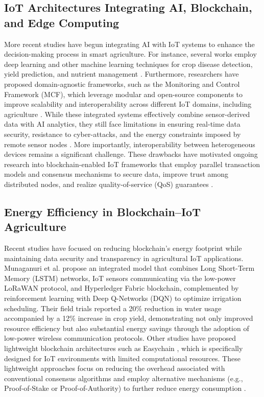 \documentclass[12pt,onecolumn]{IEEEtran} %
\begin{document}
  \subsection{IoT Architectures Integrating AI, Blockchain, and Edge Computing}\label{subsec:lit-ai-bc-edge}
More recent studies have begun integrating AI with IoT systems to enhance the decision-making process in smart agriculture. For instance, several works employ deep learning and other machine learning techniques for crop disease detection, yield prediction, and nutrient management \cite{raju2022aselfpoweredrealtime, bakthavatchalam2022iotframeworkfor}. Furthermore, researchers have proposed domain-agnostic frameworks, such as the Monitoring and Control Framework (MCF), which leverage modular and open-source components to improve scalability and interoperability across different IoT domains, including agriculture \cite{senoo2023monitoringandcontrol, senoo2023monitoringandcontrol}. While these integrated systems effectively combine sensor-derived data with AI analytics, they still face limitations in ensuring real-time data security, resistance to cyber-attacks, and the energy constraints imposed by remote sensor nodes \cite{abunadi2022trafficawaresecuredcooperative, ouafiq2022datamanagementand}. More importantly, interoperability between heterogeneous devices remains a significant challenge. These drawbacks have motivated ongoing research into blockchain-enabled IoT frameworks that employ parallel transaction models and consensus mechanisms to secure data, improve trust among distributed nodes, and realize quality-of-service (QoS) guarantees \cite{quy2022iotenabledsmartagriculture, abunadi2022trafficawaresecuredcooperative}.


  \subsection{Energy Efficiency in Blockchain–IoT Agriculture}\label{subsec:lit-energy}
Recent studies have focused on reducing blockchain’s energy footprint while maintaining data security and transparency in agricultural IoT applications. Munaganuri et al. \cite{munaganuri2025designofan} propose an integrated model that combines Long Short-Term Memory (LSTM) networks, IoT sensors communicating via the low-power LoRaWAN protocol, and Hyperledger Fabric blockchain, complemented by reinforcement learning with Deep Q-Networks (DQN) to optimize irrigation scheduling. Their field trials reported a 20\% reduction in water usage accompanied by a 12\% increase in crop yield, demonstrating not only improved resource efficiency but also substantial energy savings through the adoption of low-power wireless communication protocols. Other studies have proposed lightweight blockchain architectures such as Easychain \cite{bapatla2023easychainaniotfriendly}, which is specifically designed for IoT environments with limited computational resources. These lightweight approaches focus on reducing the overhead associated with conventional consensus algorithms and employ alternative mechanisms (e.g., Proof-of-Stake or Proof-of-Authority) to further reduce energy consumption \cite{alkhateeb2022hybridblockchainplatforms, tahayur2024enhancingelectronicagriculture}.
\end{document}
